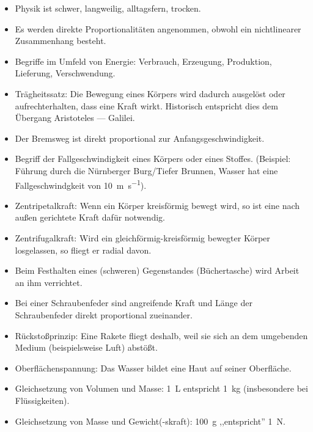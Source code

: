 \begin{itemize}
\item Physik ist schwer, langweilig, alltagsfern, trocken.
\item
Es werden direkte Proportionalit\"{a}ten angenommen, obwohl ein
nichtlinearer Zusammenhang besteht.
\item
Begriffe im Umfeld von Energie: Verbrauch, Erzeugung,
Produktion, Lieferung, Verschwendung.
\end{itemize}

\begin{itemize}
\item Tr\"{a}gheitssatz:
Die Bewegung eines K\"{o}rpers wird dadurch ausgel\"{o}st oder
aufrechterhalten, dass eine Kraft wirkt.
Historisch entspricht dies dem \"{U}bergang Aristoteles --- Galilei.
\item Der Bremsweg ist direkt proportional zur Anfangsgeschwindigkeit.
\item Begriff der Fallgeschwindigkeit eines K\"{o}rpers oder eines
Stoffes.
(Beispiel: F\"{u}hrung durch die N\"{u}rnberger Burg/Tiefer
Brunnen, Wasser hat eine Fallgeschwindgkeit von \SI{10}{\meter\per\second}).
\item Zentripetalkraft: Wenn ein K\"{o}rper kreisf\"{o}rmig bewegt wird,
so ist eine nach au{\ss}en gerichtete Kraft daf\"{u}r notwendig.
\item Zentrifugalkraft: Wird ein gleichf\"{o}rmig-kreisf\"{o}rmig bewegter K\"{o}rper losgelassen, so fliegt er radial davon.
\item
Beim Festhalten eines (schweren) Gegenstandes (B\"{u}chertasche) wird Arbeit an ihm verrichtet.
\item
Bei einer Schraubenfeder sind angreifende Kraft und L\"{a}nge der Schraubenfeder
direkt proportional zueinander.
\item R\"{u}cksto{\ss}prinzip: Eine Rakete fliegt deshalb, weil sie sich an dem umgebenden Medium (beispielsweise Luft) abst\"{o}{\ss}t.
\item
Oberfl\"{a}chenspannung: Das Wasser bildet eine Haut auf seiner Oberfl\"{a}che.
\item
Gleichsetzung von Volumen und Masse: \SI{1}{\liter} entspricht \SI{1}{\kilogram} (insbesondere bei Fl\"{u}ssigkeiten).
\item
Gleichsetzung von Masse und Gewicht(-skraft): \SI{100}{\gram} ,,entspricht'' \SI{1}{\newton}.
\end{itemize}


